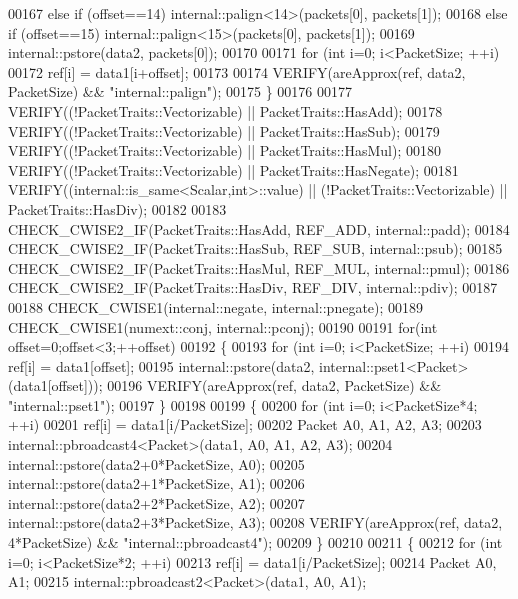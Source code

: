 \begin{DoxyCode}
00167     \textcolor{keywordflow}{else} \textcolor{keywordflow}{if} (offset==14) internal::palign<14>(packets[0], packets[1]);
00168     \textcolor{keywordflow}{else} \textcolor{keywordflow}{if} (offset==15) internal::palign<15>(packets[0], packets[1]);
00169     internal::pstore(data2, packets[0]);
00170 
00171     \textcolor{keywordflow}{for} (\textcolor{keywordtype}{int} i=0; i<PacketSize; ++i)
00172       ref[i] = data1[i+offset];
00173 
00174     VERIFY(areApprox(ref, data2, PacketSize) && \textcolor{stringliteral}{"internal::palign"});
00175   \}
00176 
00177   VERIFY((!PacketTraits::Vectorizable) || PacketTraits::HasAdd);
00178   VERIFY((!PacketTraits::Vectorizable) || PacketTraits::HasSub);
00179   VERIFY((!PacketTraits::Vectorizable) || PacketTraits::HasMul);
00180   VERIFY((!PacketTraits::Vectorizable) || PacketTraits::HasNegate);
00181   VERIFY((internal::is\_same<Scalar,int>::value) || (!PacketTraits::Vectorizable) || PacketTraits::HasDiv);
00182 
00183   CHECK\_CWISE2\_IF(PacketTraits::HasAdd, REF\_ADD,  internal::padd);
00184   CHECK\_CWISE2\_IF(PacketTraits::HasSub, REF\_SUB,  internal::psub);
00185   CHECK\_CWISE2\_IF(PacketTraits::HasMul, REF\_MUL,  internal::pmul);
00186   CHECK\_CWISE2\_IF(PacketTraits::HasDiv, REF\_DIV, internal::pdiv);
00187 
00188   CHECK\_CWISE1(internal::negate, internal::pnegate);
00189   CHECK\_CWISE1(numext::conj, internal::pconj);
00190 
00191   \textcolor{keywordflow}{for}(\textcolor{keywordtype}{int} offset=0;offset<3;++offset)
00192   \{
00193     \textcolor{keywordflow}{for} (\textcolor{keywordtype}{int} i=0; i<PacketSize; ++i)
00194       ref[i] = data1[offset];
00195     internal::pstore(data2, internal::pset1<Packet>(data1[offset]));
00196     VERIFY(areApprox(ref, data2, PacketSize) && \textcolor{stringliteral}{"internal::pset1"});
00197   \}
00198 
00199   \{
00200     \textcolor{keywordflow}{for} (\textcolor{keywordtype}{int} i=0; i<PacketSize*4; ++i)
00201       ref[i] = data1[i/PacketSize];
00202     Packet A0, A1, A2, A3;
00203     internal::pbroadcast4<Packet>(data1, A0, A1, A2, A3);
00204     internal::pstore(data2+0*PacketSize, A0);
00205     internal::pstore(data2+1*PacketSize, A1);
00206     internal::pstore(data2+2*PacketSize, A2);
00207     internal::pstore(data2+3*PacketSize, A3);
00208     VERIFY(areApprox(ref, data2, 4*PacketSize) && \textcolor{stringliteral}{"internal::pbroadcast4"});
00209   \}
00210 
00211   \{
00212     \textcolor{keywordflow}{for} (\textcolor{keywordtype}{int} i=0; i<PacketSize*2; ++i)
00213       ref[i] = data1[i/PacketSize];
00214     Packet A0, A1;
00215     internal::pbroadcast2<Packet>(data1, A0, A1);

\end{DoxyCode}
